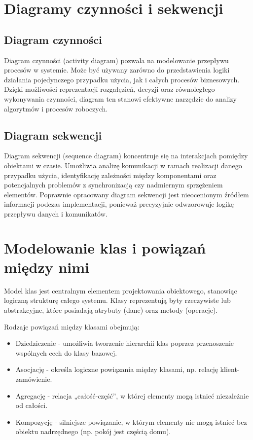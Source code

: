 \documentclass[12pt,a4paper]{article}
\begin{document}
\section{Diagramy czynności i sekwencji}
\subsection{Diagram czynności}

Diagram czynności (activity diagram) pozwala na modelowanie przepływu procesów w systemie. Może być używany zarówno do przedstawienia logiki działania pojedynczego przypadku użycia, jak i całych procesów biznesowych. Dzięki możliwości reprezentacji rozgałęzień, decyzji oraz równoległego wykonywania czynności, diagram ten stanowi efektywne narzędzie do analizy algorytmów i procesów roboczych.

\subsection{Diagram sekwencji}

Diagram sekwencji (sequence diagram) koncentruje się na interakcjach pomiędzy obiektami w czasie. Umożliwia analizę komunikacji w ramach realizacji danego przypadku użycia, identyfikację zależności między komponentami oraz potencjalnych problemów z synchronizacją czy nadmiernym sprzężeniem elementów.
Poprawnie opracowany diagram sekwencji jest nieocenionym źródłem informacji podczas implementacji, ponieważ precyzyjnie odwzorowuje logikę przepływu danych i komunikatów.

\section{Modelowanie klas i powiązań między nimi}

Model klas jest centralnym elementem projektowania obiektowego, stanowiąc logiczną strukturę całego systemu. Klasy reprezentują byty rzeczywiste lub abstrakcyjne, które posiadają atrybuty (dane) oraz metody (operacje).

Rodzaje powiązań między klasami obejmują:
\begin{itemize}
\item Dziedziczenie - umożliwia tworzenie hierarchii klas poprzez przenoszenie wspólnych cech do klasy bazowej.
\item Asocjację - określa logiczne powiązania między klasami, np. relację klient-zamówienie.
\item Agregację - relacja „całość-część”, w której elementy mogą istnieć niezależnie od całości.
\item Kompozycję - silniejsze powiązanie, w którym elementy nie mogą istnieć bez obiektu nadrzędnego (np. pokój jest częścią domu).
\end{itemize}
\end{document}
